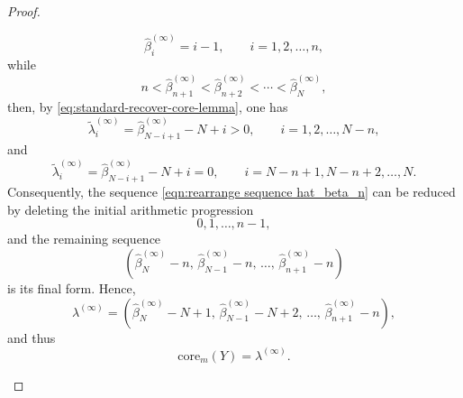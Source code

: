 \documentclass[preprint,3p,10pt]{elsarticle}
\theoremstyle{definition}
\begin{document}
\begin{proof}
\begin{itemize}
    \begin{equation}
        \widehat{\beta}^{(\infty)}_i=i-1,
        \qquad i=1,2,\ldots,n,
    \end{equation}
    while
    \begin{equation}
        n<\widehat{\beta}^{(\infty)}_{n+1}<\widehat{\beta}^{(\infty)}_{n+2}<\cdots<\widehat{\beta}^{(\infty)}_N,
    \end{equation}
    then, by \eqref{eq:standard-recover-core-lemma}, one has
    \begin{equation}
        \tilde{\lambda}^{(\infty)}_i
        =
        \widehat{\beta}^{(\infty)}_{N-i+1}-N+i>0,
        \qquad i=1,2,\ldots,N-n,
    \end{equation}
    and
    \begin{equation}
        \tilde{\lambda}^{(\infty)}_i
        =
        \widehat{\beta}^{(\infty)}_{N-i+1}-N+i=0,
        \qquad i=N-n+1,N-n+2,\ldots,N.
    \end{equation}
    Consequently, the sequence \eqref{eqn:rearrange sequence hat_beta_n} can be reduced by deleting the initial arithmetic progression
    \begin{equation}
        0,1,\ldots,n-1,
    \end{equation}
    and the remaining sequence
    \begin{equation}
        \left(
        \widehat{\beta}^{(\infty)}_N-n,\,
        \widehat{\beta}^{(\infty)}_{N-1}-n,\,
        \ldots,\,
        \widehat{\beta}^{(\infty)}_{n+1}-n
        \right)
    \end{equation}
    is its final form. Hence,
    \begin{equation}
        \lambda^{(\infty)}
        =
        \left(
        \widehat{\beta}^{(\infty)}_N-N+1,\,
        \widehat{\beta}^{(\infty)}_{N-1}-N+2,\,
        \ldots,\,
        \widehat{\beta}^{(\infty)}_{n+1}-n
        \right),
    \end{equation}
    and thus
    \begin{equation}
        \mathrm{core}_m(Y)=\lambda^{(\infty)}.
    \end{equation}
\end{itemize}


\end{proof}
\end{document}
